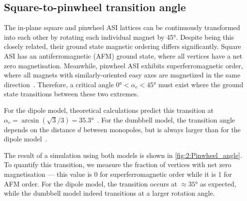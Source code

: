 \subsection{Square-to-pinwheel transition angle}\label{sec:2:Verification_IP_SquarePinwheel}
The in-plane square and pinwheel ASI lattices can be continuously transformed into each other by rotating each individual magnet by \ang{45}.
Despite being this closely related, their ground state magnetic ordering differs significantly.
Square ASI has an antiferromagnetic (AFM) ground state, where all vertices have a net zero magnetisation.
Meanwhile, pinwheel ASI exhibits superferromagnetic order, where all magnets with similarly-oriented easy axes are magnetized in the same direction~\cite{ApparentFMpinwheel}.
Therefore, a critical angle $\ang{0} < \alpha_c < \ang{45}$ must exist where the ground state transitions between these two extremes. \par
For the dipole model, theoretical calculations predict this transition at $\alpha_c = \arcsin(\sqrt{3}/3) = \ang{35.3}$~\cite{AFM-FM-transition-Pinwheel,MagicAngle}.
For the dumbbell model, the transition angle depends on the distance $d$ between monopoles, but is always larger than for the dipole model~\cite{AFM-FM-transition-Pinwheel}. \\\par
The result of a \hotspice simulation using both models is shown in \cref{fig:2:Pinwheel_angle}.
To quantify this transition, we measure the fraction of vertices with net zero magnetisation --- this value is 0 for superferromagnetic order while it is 1 for AFM order.
For the dipole model, the transition occurs at $\approx \ang{35}$ as expected, while the dumbbell model indeed transitions at a larger rotation angle.

